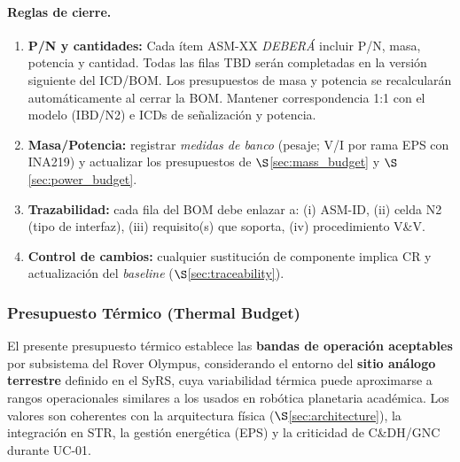 \paragraph{Reglas de cierre.}
\begin{enumerate}
  \item \textbf{P/N y cantidades:} Cada ítem ASM-XX \emph{DEBERÁ} incluir P/N, masa, potencia y cantidad. Todas las filas TBD serán completadas en la versión siguiente del ICD/BOM. Los presupuestos de masa y potencia se recalcularán automáticamente al cerrar la BOM. Mantener correspondencia 1:1 con el modelo (IBD/N2) e ICDs de señalización y potencia. \cite{nasa_cm}
  \item \textbf{Masa/Potencia:} registrar \emph{medidas de banco} (pesaje; V/I por rama EPS con INA219) y actualizar los presupuestos de $\S$\ref{sec:mass_budget} y $\S$\ref{sec:power_budget}. \cite{nasa_cm}
  \item \textbf{Trazabilidad:} cada fila del BOM debe enlazar a: (i) ASM-ID, (ii) celda N2 (tipo de interfaz), (iii) requisito(s) que soporta, (iv) procedimiento V\&V. \cite{nasa_cm}
  \item \textbf{Control de cambios:} cualquier sustitución de componente implica CR y actualización del \emph{baseline} ($\S$\ref{sec:traceability}). \cite{nasa_cm}
\end{enumerate}


\subsubsection{Presupuesto Térmico (Thermal Budget)}
\label{sec:thermal_budget}

El presente presupuesto térmico establece las \textbf{bandas de operación aceptables} por subsistema del Rover Olympus, considerando el entorno del \textbf{sitio análogo terrestre} definido en el SyRS, cuya variabilidad térmica puede aproximarse a rangos operacionales similares a los usados en robótica planetaria académica. Los valores son coherentes con la arquitectura física ($\S$\ref{sec:architecture}), la integración en STR, la gestión energética (EPS) y la criticidad de C\&DH/GNC durante UC-01. \cite{nasa_cm}

